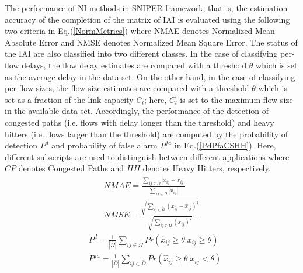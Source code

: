 The performance of NI methods in SNIPER framework, that is, the estimation accuracy of the completion of the matrix of IAI is evaluated using the following two criteria in Eq.(\ref{NormMetrics}) where NMAE denotes Normalized Mean Absolute Error and NMSE denotes Normalized Mean Square Error. The status of the IAI are also classified into two different classes. In the case of classifying per-flow delays, the flow delay estimates are compared with a threshold $\theta$ which is set as the average delay in the data-set. On the other hand, in the case of classifying per-flow sizes, the flow size estimates are compared with a threshold $\theta$ which is set as a fraction of the link capacity $C_{l}$; here, $C_{l}$ is set to the maximum flow size in the available data-set. Accordingly, the performance of the detection of congested paths (i.e. flows with delay longer than the threshold) and heavy hitters (i.e. flows larger than the threshold) are computed by the probability of detection $P^{d}$ and probability of false alarm $P^{fa}$ in Eq.(\ref{PdPfaCSHH}). Here, different subscripts are used to distinguish between different applications where $CP$ denotes Congested Paths and $HH$ denotes Heavy Hitters, respectively.
\begin{equation} \label{NormMetrics}
\begin{aligned}
NMAE = \frac{\sum_{ij \in \bar{\Omega}} \left|x_{ij} - \hat{x}_{ij}\right|}{\sum_{ij \in \bar{\Omega}} \left|x_{ij}\right|} \\
 NMSE = \frac{\sqrt{\sum_{ij \in \bar{\Omega}} \left(x_{ij} - \hat{x}_{ij}\right)^{2} }}{\sqrt{\sum_{ij \in \bar{\Omega}} \left(x_{ij}\right)^{2}}}
\end{aligned}
\end{equation}
\begin{equation} \label{PdPfaCSHH}
\begin{aligned}
& P^{d} = \frac{1}{\left| \bar{\Omega} \right|} \sum_{ij \in \bar{\Omega}}  Pr\left( \hat{x}_{ij} \geq \theta | x_{ij} \geq \theta \right) \\
& P^{fa} = \frac{1}{\left| \bar{\Omega} \right|} \sum_{ij \in \bar{\Omega}} Pr\left( \hat{x}_{ij} \geq \theta | x_{ij} < \theta \right) \\
\end{aligned}
\end{equation}